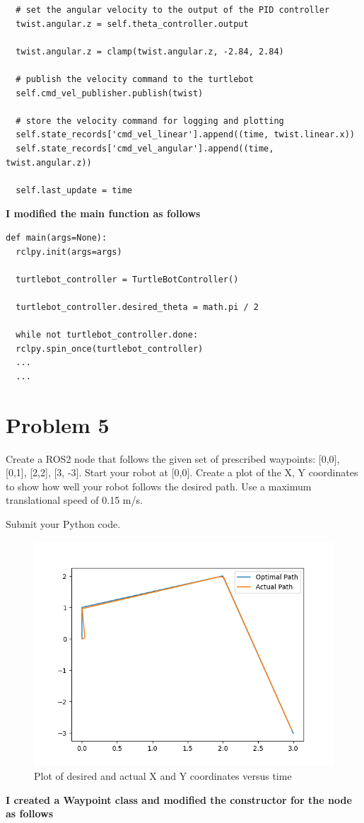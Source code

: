 \documentclass{article}
\begin{document}
\begin{verbatim}
  # set the angular velocity to the output of the PID controller
  twist.angular.z = self.theta_controller.output

  twist.angular.z = clamp(twist.angular.z, -2.84, 2.84)

  # publish the velocity command to the turtlebot
  self.cmd_vel_publisher.publish(twist)

  # store the velocity command for logging and plotting
  self.state_records['cmd_vel_linear'].append((time, twist.linear.x))
  self.state_records['cmd_vel_angular'].append((time, twist.angular.z))

  self.last_update = time
\end{verbatim}

\noindent \textbf{I modified the main function as follows}

\begin{verbatim}
def main(args=None):
  rclpy.init(args=args)

  turtlebot_controller = TurtleBotController()

  turtlebot_controller.desired_theta = math.pi / 2

  while not turtlebot_controller.done:
  rclpy.spin_once(turtlebot_controller)
  ...
  ...
\end{verbatim}

\section*{Problem 5}
Create a ROS2 node that follows the given set of prescribed waypoints: [0,0], [0,1], [2,2], [3, -3]. Start
your robot at [0,0]. Create a plot of the X, Y coordinates to show how well your robot follows the
desired path. Use a maximum translational speed of 0.15 m/s.

\bigskip
\noindent Submit your Python code.

\begin{figure}[H]
  \centering
  \includegraphics[width=\textwidth]{question5-b.png}
  \caption*{Plot of desired and actual X and Y coordinates versus time}
\end{figure}
\noindent \textbf{I created a Waypoint class and modified the constructor for the node as follows}
\end{document}
